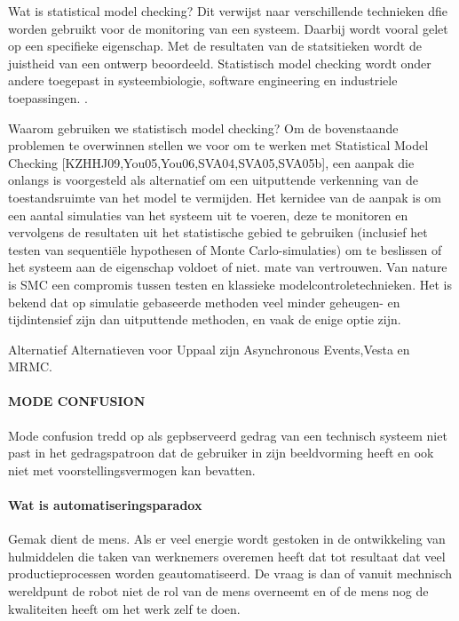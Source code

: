 Wat is statistical model checking?
Dit verwijst naar verschillende technieken dfie worden gebruikt voor de monitoring van een systeem. Daarbij wordt vooral gelet op een specifieke eigenschap. Met de resultaten van de statsitieken wordt de juistheid van een ontwerp beoordeeld. Statistisch model checking wordt onder andere toegepast in systeembiologie, software engineering en industriele toepassingen.
\cite{verimagStatsModelChecking}.


\cite{inriaStatsMoodCheck}
\cite{ buddeModelChecker}
\cite{AGHASuervey }


Waarom gebruiken we statistisch model checking?
Om de bovenstaande problemen te overwinnen stellen we voor om te werken met Statistical Model Checking [KZHHJ09,You05,You06,SVA04,SVA05,SVA05b], een aanpak die onlangs is voorgesteld als alternatief om een uitputtende verkenning van de toestandsruimte van het model te vermijden. Het kernidee van de aanpak is om een aantal simulaties van het systeem uit te voeren, deze te monitoren en vervolgens de resultaten uit het statistische gebied te gebruiken (inclusief het testen van sequentiële hypothesen of Monte Carlo-simulaties) om te beslissen of het systeem aan de eigenschap voldoet of niet. mate van vertrouwen. Van nature is SMC een compromis tussen testen en klassieke modelcontroletechnieken. Het is bekend dat op simulatie gebaseerde methoden veel minder geheugen- en tijdintensief zijn dan uitputtende methoden, en vaak de enige optie zijn.
\cite{inriaStatsMoodCheck}

Alternatief
Alternatieven voor Uppaal zijn Asynchronous Events,Vesta en MRMC.


\paragraph{MODE CONFUSION }
Mode confusion tredd op als gepbserveerd gedrag van een technisch systeem niet past in het gedragspatroon dat de gebruiker in zijn beeldvorming heeft  en ook niet met voorstellingsvermogen kan bevatten.
\paragraph{Wat is automatiseringsparadox}
Gemak dient de mens. Als er veel energie wordt gestoken in de ontwikkeling van hulmiddelen die taken van werknemers overemen heeft dat tot resultaat dat veel productieprocessen worden geautomatiseerd. De vraag is dan of vanuit mechnisch wereldpunt de robot niet de rol van de mens overneemt en of de mens nog de kwaliteiten heeft om het werk zelf te doen.
\cite{bicker21102016automatiseringsparadox }
\cite{vseautoparadox }
\cite{blogxot21112016slimapparaat }



